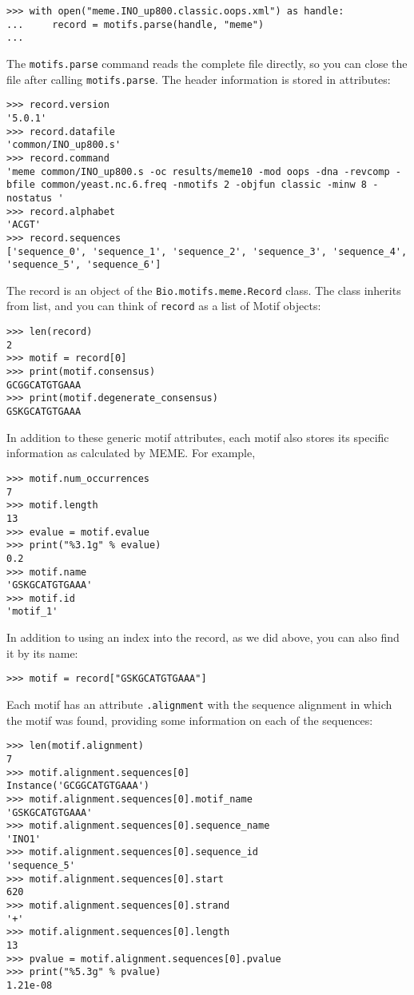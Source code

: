 \begin{verbatim}
>>> with open("meme.INO_up800.classic.oops.xml") as handle:
...     record = motifs.parse(handle, "meme")
...
\end{verbatim}
The \verb+motifs.parse+ command reads the complete file directly, so you can
close the file after calling \verb+motifs.parse+.
The header information is stored in attributes:

\begin{verbatim}
>>> record.version
'5.0.1'
>>> record.datafile
'common/INO_up800.s'
>>> record.command
'meme common/INO_up800.s -oc results/meme10 -mod oops -dna -revcomp -bfile common/yeast.nc.6.freq -nmotifs 2 -objfun classic -minw 8 -nostatus '
>>> record.alphabet
'ACGT'
>>> record.sequences
['sequence_0', 'sequence_1', 'sequence_2', 'sequence_3', 'sequence_4', 'sequence_5', 'sequence_6']
\end{verbatim}
The record is an object of the \verb+Bio.motifs.meme.Record+ class.
The class inherits from list, and you can think of \verb+record+ as a list of Motif objects:

\begin{verbatim}
>>> len(record)
2
>>> motif = record[0]
>>> print(motif.consensus)
GCGGCATGTGAAA
>>> print(motif.degenerate_consensus)
GSKGCATGTGAAA
\end{verbatim}
In addition to these generic motif attributes, each motif also stores its
specific information as calculated by MEME. For example,

\begin{verbatim}
>>> motif.num_occurrences
7
>>> motif.length
13
>>> evalue = motif.evalue
>>> print("%3.1g" % evalue)
0.2
>>> motif.name
'GSKGCATGTGAAA'
>>> motif.id
'motif_1'
\end{verbatim}
In addition to using an index into the record, as we did above,
you can also find it by its name:

\begin{verbatim}
>>> motif = record["GSKGCATGTGAAA"]
\end{verbatim}
Each motif has an attribute \verb+.alignment+ with the sequence alignment
in which the motif was found, providing some information on each of the sequences:

\begin{verbatim}
>>> len(motif.alignment)
7
>>> motif.alignment.sequences[0]
Instance('GCGGCATGTGAAA')
>>> motif.alignment.sequences[0].motif_name
'GSKGCATGTGAAA'
>>> motif.alignment.sequences[0].sequence_name
'INO1'
>>> motif.alignment.sequences[0].sequence_id
'sequence_5'
>>> motif.alignment.sequences[0].start
620
>>> motif.alignment.sequences[0].strand
'+'
>>> motif.alignment.sequences[0].length
13
>>> pvalue = motif.alignment.sequences[0].pvalue
>>> print("%5.3g" % pvalue)
1.21e-08
\end{verbatim}

